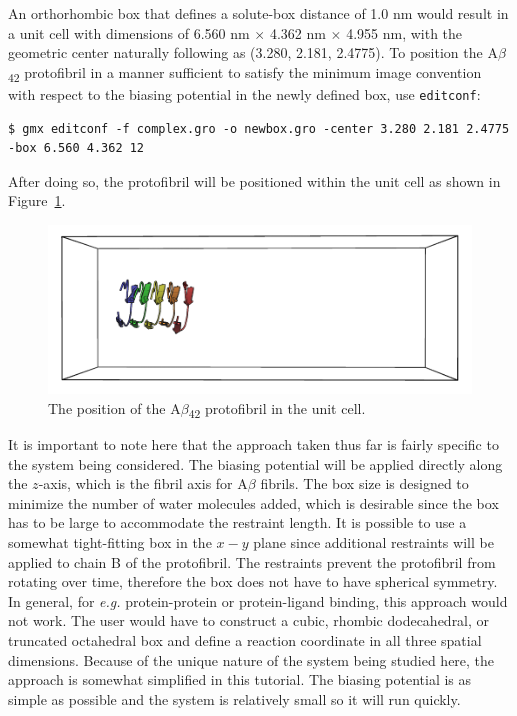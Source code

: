 \documentclass[9pt,tutorial,pubversion]{livecoms}
\begin{document}
An orthorhombic box that defines a solute-box distance of 1.0 nm would result in a unit cell with dimensions of 6.560 nm $\times$ 4.362 nm $\times$ 4.955 nm, with the geometric center naturally following as (3.280, 2.181, 2.4775). To position the A$\beta$\textsubscript{42} protofibril in a manner sufficient to satisfy the minimum image convention with respect to the biasing potential in the newly defined box, use \texttt{editconf}:

\begin{lstlisting}
$ gmx editconf -f complex.gro -o newbox.gro -center 3.280 2.181 2.4775 -box 6.560 4.362 12
\end{lstlisting}

After doing so, the protofibril will be positioned within the unit cell as shown in Figure~\ref{umbrella_box_fig}.

\begin{figure}[H]
\centering
\includegraphics{umbrella_protofibril_box}
\caption{The position of the A$\beta$\textsubscript{42} protofibril in the unit cell.}
\label{umbrella_box_fig}
\end{figure}

It is important to note here that the approach taken thus far is fairly specific to the system being considered. The biasing potential will be applied directly along the $z$-axis, which is the fibril axis for A$\beta$ fibrils. The box size is designed to minimize the number of water molecules added, which is desirable since the box has to be large to accommodate the restraint length. It is possible to use a somewhat tight-fitting box in the $x-y$ plane since additional restraints will be applied to chain B of the protofibril. The restraints prevent the protofibril from rotating over time, therefore the box does not have to have spherical symmetry. In general, for {\em e.g.} protein-protein or protein-ligand binding, this approach would not work. The user would have to construct a cubic, rhombic dodecahedral, or truncated octahedral box and define a reaction coordinate in all three spatial dimensions. Because of the unique nature of the system being studied here, the approach is somewhat simplified in this tutorial. The biasing potential is as simple as possible and the system is relatively small so it will run quickly.
\end{document}
